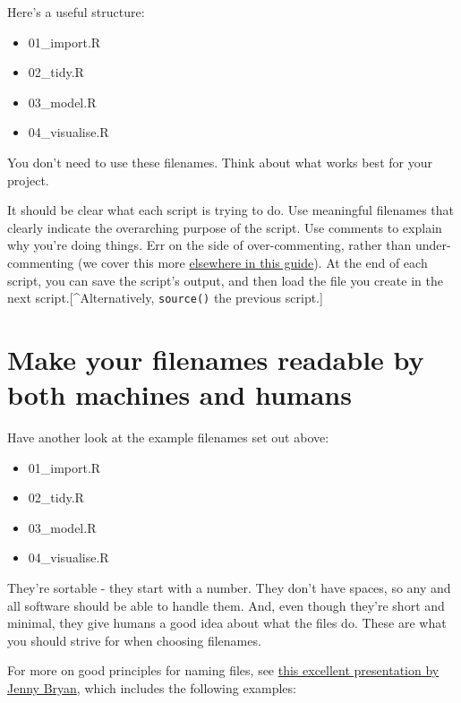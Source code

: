 \documentclass[
]{book}
\providecommand{\tightlist}{%
  \setlength{\itemsep}{0pt}\setlength{\parskip}{0pt}}
\begin{document}
Here's a useful structure:

\begin{itemize}
\tightlist
\item
  01\_import.R
\item
  02\_tidy.R
\item
  03\_model.R
\item
  04\_visualise.R
\end{itemize}

You don't need to use these filenames. Think about what works best for your project.

It should be clear what each script is trying to do. Use meaningful filenames that clearly indicate the overarching purpose of the script. Use comments to explain why you're doing things. Err on the side of over-commenting, rather than under-commenting (we cover this more \protect\hyperlink{use-comments}{elsewhere in this guide}). At the end of each script, you can save the script's output, and then load the file you create in the next script.{[}\^{}Alternatively, \texttt{source()} the previous script.{]}

\hypertarget{make-your-filenames-readable-by-both-machines-and-humans}{%
\section{Make your filenames readable by both machines and humans}\label{make-your-filenames-readable-by-both-machines-and-humans}}

Have another look at the example filenames set out above:

\begin{itemize}
\tightlist
\item
  01\_import.R
\item
  02\_tidy.R
\item
  03\_model.R
\item
  04\_visualise.R
\end{itemize}

They're sortable - they start with a number. They don't have spaces, so any and all software should be able to handle them. And, even though they're short and minimal, they give humans a good idea about what the files do. These are what you should strive for when choosing filenames.

For more on good principles for naming files, see \href{https://speakerdeck.com/jennybc/how-to-name-files}{this excellent presentation by Jenny Bryan}, which includes the following examples:
\end{document}
